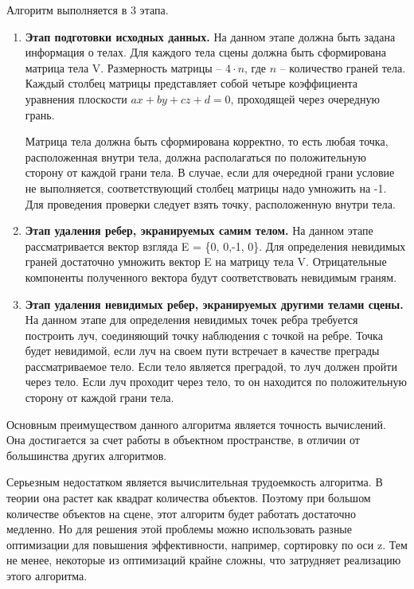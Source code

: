 Алгоритм выполняется в 3 этапа.
\begin{enumerate}[]
	\item \textbf{Этап подготовки исходных данных.} 	На данном этапе должна быть задана информация о телах. Для каждого тела сцены должна быть сформирована матрица тела V. Размерность матрицы – $4 \cdot n$, где $n$ – количество граней тела. Каждый столбец матрицы представляет собой четыре коэффициента уравнения плоскости $ax+by+cz+d=0$, проходящей через очередную грань. 
	
	Матрица тела должна быть сформирована корректно, то есть любая точка, расположенная внутри тела, должна располагаться по положительную сторону от каждой грани тела. В случае, если для очередной грани условие не выполняется, соответствующий столбец матрицы надо умножить на -1. Для проведения проверки следует взять точку, расположенную внутри тела.
	
	\item \textbf{Этап удаления ребер, экранируемых самим телом.} На данном этапе рассматривается вектор взгляда E = \{0, 0,-1, 0\}. Для определения невидимых граней достаточно умножить вектор E на матрицу тела V. Отрицательные компоненты полученного вектора будут соответствовать невидимым граням.
	
	\item \textbf{Этап удаления невидимых ребер, экранируемых другими телами сцены.} На данном этапе для определения невидимых точек ребра требуется построить луч, соединяющий точку наблюдения с точкой на ребре. Точка будет невидимой, если луч на своем пути встречает в качестве преграды рассматриваемое тело. Если тело является преградой, то луч должен пройти через тело. Если луч проходит через тело, то он находится по положительную сторону от каждой грани тела.	
\end{enumerate}

Основным преимуществом данного алгоритма является точность вычислений. Она достигается за счет работы в объектном пространстве, в отличии от большинства других алгоритмов.
 
Серьезным недостатком является вычислительная трудоемкость алгоритма. В теории она растет как квадрат количества объектов. Поэтому при большом количестве объектов на сцене, этот алгоритм будет работать достаточно медленно. Но для решения этой проблемы можно использовать разные оптимизации для повышения эффективности, например, сортировку по оси z. Тем не менее, некоторые из оптимизаций крайне сложны, что затрудняет реализацию этого алгоритма.

